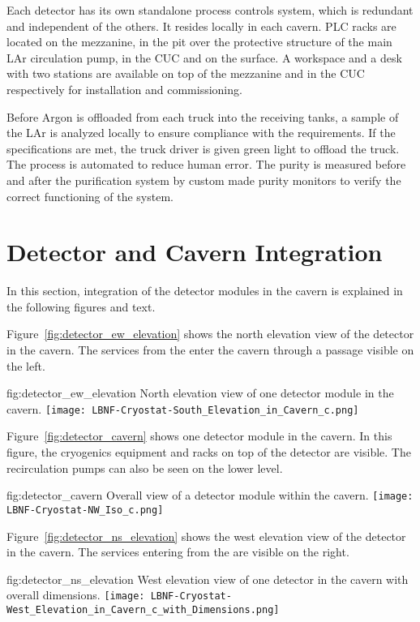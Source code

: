Each detector has its own standalone process controls system, which is
redundant and independent of the others. It resides locally in each
cavern.  PLC racks are located on the mezzanine, in the pit over the
protective structure of the main LAr circulation pump, in the CUC and
on the surface. A workspace and a desk with two stations are available
on top of the mezzanine and in the CUC respectively for installation
and commissioning.

Before Argon is offloaded from each truck into the receiving tanks, a
sample of the LAr is analyzed locally to ensure compliance with the
requirements. If the specifications are met, the truck driver is given
green light to offload the truck. The process is automated to reduce
human error. The purity is measured before and after the purification
system by custom made purity monitors to verify the correct
functioning of the system.


\section{Detector and Cavern Integration}
\label{sec:fdsp-coord-det-cav-integ}
In this section, integration of the detector modules in the cavern is
explained in the following figures and text.

Figure~\ref{fig:detector_ew_elevation} shows the north
elevation view of the detector in the cavern. The services from the
 enter the cavern through a passage visible on the left.
\begin{dunefigure}{fig:detector_ew_elevation}
  {North elevation view of one detector module in the cavern.}
  \texttt{[image: LBNF-Cryostat-South\_Elevation\_in\_Cavern\_c.png]}
\end{dunefigure}

Figure~\ref{fig:detector_cavern} shows one detector module in the
cavern. In this figure, the cryogenics equipment and racks on top of
the detector are visible. The  recirculation pumps can also be seen
on the lower level.
\begin{dunefigure}{fig:detector_cavern}
  {Overall view of a detector module within the cavern.}
  \texttt{[image: LBNF-Cryostat-NW\_Iso\_c.png]}
\end{dunefigure}

Figure~\ref{fig:detector_ns_elevation} shows the west
elevation view of the detector in the cavern. The services entering
from the  are visible on the right.
\begin{dunefigure}{fig:detector_ns_elevation}
  {West elevation view of one detector in the cavern with overall dimensions.}
  \texttt{[image: LBNF-Cryostat-West\_Elevation\_in\_Cavern\_c\_with\_Dimensions.png]}
\end{dunefigure}

